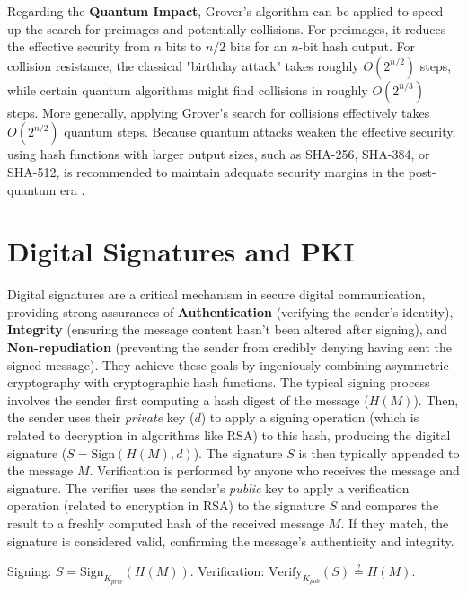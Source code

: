 Regarding the \textbf{Quantum Impact}, Grover's algorithm \parencite{grover1996fast} can be applied to speed up the search for preimages and potentially collisions. For preimages, it reduces the effective security from $n$ bits to $n/2$ bits for an $n$-bit hash output. For collision resistance, the classical "birthday attack" takes roughly $O(2^{n/2})$ steps, while certain quantum algorithms might find collisions in roughly $O(2^{n/3})$ steps. More generally, applying Grover's search for collisions effectively takes $O(2^{n/2})$ quantum steps. Because quantum attacks weaken the effective security, using hash functions with larger output sizes, such as SHA-256, SHA-384, or SHA-512, is recommended to maintain adequate security margins in the post-quantum era \parencite{bernstein2017post}.

\section{Digital Signatures and PKI}\label{sec:digital_signatures_pki_ch3}

Digital signatures are a critical mechanism in secure digital communication, providing strong assurances of \textbf{Authentication} (verifying the sender's identity), \textbf{Integrity} (ensuring the message content hasn't been altered after signing), and \textbf{Non-repudiation} (preventing the sender from credibly denying having sent the signed message). They achieve these goals by ingeniously combining asymmetric cryptography with cryptographic hash functions. The typical signing process involves the sender first computing a hash digest of the message ($H(M)$). Then, the sender uses their \textit{private} key ($d$) to apply a signing operation (which is related to decryption in algorithms like RSA) to this hash, producing the digital signature ($S = \text{Sign}(H(M), d)$). The signature $S$ is then typically appended to the message $M$. Verification is performed by anyone who receives the message and signature. The verifier uses the sender's \textit{public} key to apply a verification operation (related to encryption in RSA) to the signature $S$ and compares the result to a freshly computed hash of the received message $M$. If they match, the signature is considered valid, confirming the message's authenticity and integrity.

Signing: $S=\text{Sign}_{K_{priv}}(H(M))$. Verification: $\text{Verify}_{K_{pub}}(S) \stackrel{?}{=} H(M)$.

